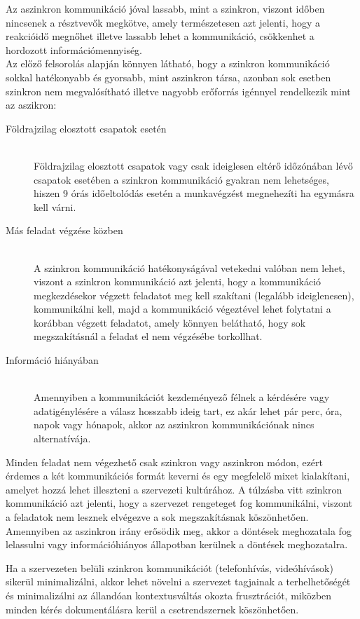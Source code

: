 Az aszinkron kommunikáció jóval lassabb, mint a szinkron, viszont időben nincsenek a résztvevők megkötve, amely természetesen azt jelenti, hogy a reakcióidő megnőhet illetve lassabb lehet a kommunikáció, csökkenhet a hordozott információmennyiség.\\
\newline
Az előző felsorolás alapján könnyen látható, hogy a szinkron kommunikáció sokkal hatékonyabb és gyorsabb, mint aszinkron társa, azonban sok esetben szinkron nem megvalósítható illetve nagyobb erőforrás igénnyel rendelkezik mint az aszikron:

\begin{description}
  \item [Földrajzilag elosztott csapatok esetén] \hfill\\
  Földrajzilag elosztott csapatok vagy csak ideiglesen eltérő időzónában lévő csapatok esetében a szinkron kommunikáció gyakran nem lehetséges, hiszen 9 órás időeltolódás esetén a munkavégzést megnehezíti ha egymásra kell várni.
  \item [Más feladat végzése közben] \hfill\\
  A szinkron kommunikáció hatékonyságával vetekedni valóban nem lehet, viszont a szinkron kommunikáció azt jelenti, hogy a kommunikáció megkezdésekor végzett feladatot meg kell szakítani (legalább ideiglenesen), kommunikálni kell, majd a kommunikáció végeztével lehet folytatni a korábban végzett feladatot, amely könnyen belátható, hogy sok megszakításnál a feladat el nem végzésébe torkollhat.
  \item [Információ hiányában] \hfill\\
  Amennyiben a kommunikációt kezdeményező félnek a kérdésére vagy adatigénylésére a válasz hosszabb ideig tart, ez akár lehet pár perc, óra, napok vagy hónapok, akkor az aszinkron kommunikációnak nincs alternatívája. 
\end{description}

Minden feladat nem végezhető csak szinkron vagy aszinkron módon, ezért érdemes a két kommunikációs formát keverni és egy megfelelő mixet kialakítani, amelyet hozzá lehet illeszteni a szervezeti kultúrához. A túlzásba vitt szinkron kommunikáció azt jelenti, hogy a szervezet rengeteget fog kommunikálni, viszont a feladatok nem lesznek elvégezve a sok megszakításnak köszönhetően. Amennyiben az aszinkron irány erősödik meg, akkor a döntések meghozatala fog lelassulni vagy információhiányos állapotban kerülnek a döntések meghozatalra.

Ha a szervezeten belüli szinkron kommunikációt (telefonhívás, videóhívások) sikerül minimalizálni, akkor lehet növelni a szervezet tagjainak a terhelhetőségét és minimalizálni az állandóan kontextusváltás okozta frusztrációt, miközben minden kérés dokumentálásra kerül a csetrendszernek köszönhetően.


